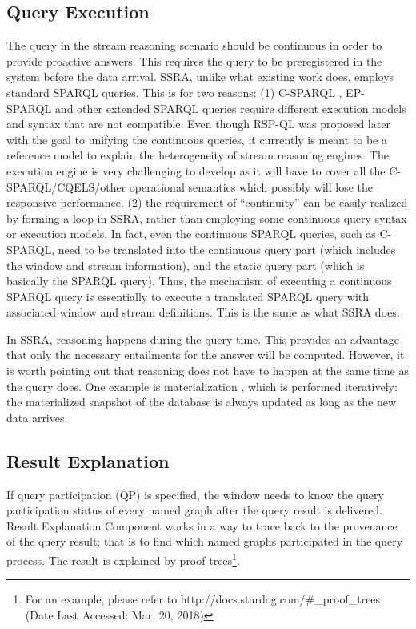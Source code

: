\subsection{Query Execution}
The query in the stream reasoning scenario should be continuous in order to provide proactive answers. 
This requires the query to be preregistered in the system before the data arrival.
SSRA, unlike what existing work does, employs standard SPARQL queries.
This is for two reasons:
(1) C-SPARQL \cite{barbieri2009c}, EP-SPARQL \cite{anicic2011ep} and other extended SPARQL queries require different execution models and syntax that are not compatible.
Even though RSP-QL \cite{dell2014rsp} was proposed later with the goal to unifying the continuous queries, it currently is meant to be a reference model to explain the heterogeneity of stream reasoning engines. 
The execution engine is very challenging to develop as it will have to cover all the C-SPARQL/CQELS/other operational semantics which possibly will lose the responsive performance.
(2) the requirement of ``continuity'' can be easily realized by forming a loop in SSRA, rather than employing some continuous query syntax or execution models. 
In fact, even the continuous SPARQL queries, such as C-SPARQL, need to be translated into the continuous query part (which includes the window and stream information), and the static query part (which is basically the SPARQL query).
Thus, the mechanism of executing a continuous SPARQL query is essentially to execute a translated SPARQL query with associated window and stream definitions.
This is the same as what SSRA does. 

In SSRA, reasoning happens during the query time. 
This provides an advantage that only the necessary entailments for the answer will be computed. 
However, it is worth pointing out that reasoning does not have to happen at the same time as the query does. 
One example is materialization \cite{barbieri2010incremental},  which is performed iteratively: the materialized snapshot of the database is always updated as long as the new data arrives. 
%
\subsection{Result Explanation}
If query participation (QP) is specified, the window needs to know the query participation status of every named graph after the query result is delivered.
Result Explanation Component works in a way to trace back to the provenance of the query result; that is to find which named graphs participated in the query process. 
The result is explained by proof trees\footnote{For an example, please refer to http://docs.stardog.com/\#\_proof\_trees (Date Last Accessed: Mar. 20, 2018)}.

